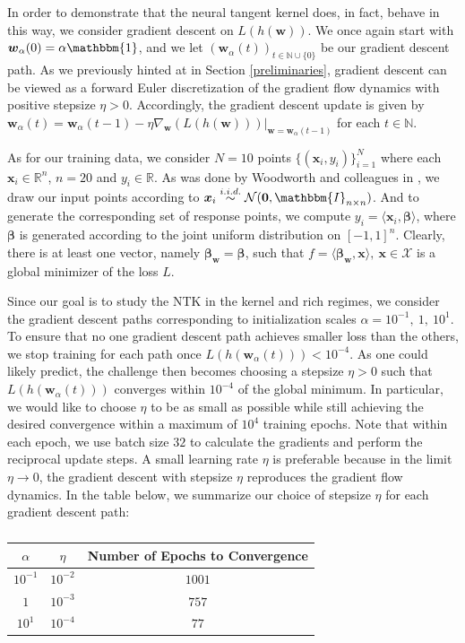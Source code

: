 \documentclass{article}
\begin{document}
In order to demonstrate that the neural tangent kernel does, in fact, behave in this way, we consider gradient descent on $L(h(\boldsymbol{w}))$. We once again start with $\boldsymbol{w}_{\alpha}(0) = \alpha \mathbbm{1}$, and we let $(\boldsymbol{w}_{\alpha}(t))_{t \in \mathbb{N} \cup \{ 0\}}$ be our gradient descent path. As we previously hinted at in Section \ref{preliminaries}, gradient descent can be viewed as a forward Euler discretization of the gradient flow dynamics with positive stepsize $\eta > 0$. Accordingly, the gradient descent update is given by $\boldsymbol{w}_{\alpha}(t) = \boldsymbol{w}_{\alpha}(t-1) - \eta \nabla_{\boldsymbol{w}} (L(h(\boldsymbol{w})))|_{\boldsymbol{w} = \boldsymbol{w}_{\alpha}(t-1)}$ for each $t \in \mathbb{N}$.

As for our training data, we consider $N=10$ points $\{ (\boldsymbol{x}_i, y_i) \}_{i=1}^N$ where each $\boldsymbol{x}_i \in \mathbb{R}^{n}$, $n = 20$ and $y_i \in \mathbb{R}$. As was done by Woodworth and colleagues in \cite{woodworth2020kernel}, we draw our input points according to $\boldsymbol{x}_i \overset{i.i.d.}{\sim} \mathcal{N}(\boldsymbol{0}, \mathbbm{I}_{n \times n})$. And to generate the corresponding set of response points, we compute $y_i = \langle \boldsymbol{x}_i, \boldsymbol{\beta} \rangle$, where $\boldsymbol{\beta}$ is generated according to the joint uniform distribution on $[-1, 1]^n$. Clearly, there is at least one vector, namely $\boldsymbol{\beta}_{\boldsymbol{w}} = \boldsymbol{\beta}$, such that $f = \langle \boldsymbol{\beta}_{\boldsymbol{w}}, \boldsymbol{x} \rangle, \ \boldsymbol{x} \in \mathcal{X}$ is a global minimizer of the loss $L$.

Since our goal is to study the NTK in the kernel and rich regimes, we consider the gradient descent paths corresponding to initialization scales $\alpha = 10^{-1}, \ 1, \ 10^{1}$. To ensure that no one gradient descent path achieves smaller loss than the others, we stop training for each path once $L(h(\boldsymbol{w}_{\alpha}(t))) < 10^{-4}$. As one could likely predict, the challenge then becomes choosing a stepsize $\eta > 0$ such that $L(h(\boldsymbol{w}_{\alpha}(t)))$ converges within $10^{-4}$ of the global minimum. In particular, we would like to choose $\eta$ to be as small as possible while still achieving the desired convergence within a maximum of $10^4$ training epochs. Note that within each epoch, we use batch size $32$ to calculate the gradients and perform the reciprocal update steps. A small learning rate $\eta$ is preferable because in the limit $\eta \rightarrow 0$, the gradient descent with stepsize $\eta$ reproduces the gradient flow dynamics. In the table below, we summarize our choice of stepsize $\eta$ for each gradient descent path:
\begin{table}[H]
\centering
\begin{tabular}{ c|c|c } 
$\alpha$ & $\eta$ & Number of Epochs to Convergence \\
\hline
$10^{-1}$ & $10^{-2}$ & $1001$ \\ 
$1$ & $10^{-3}$ & $757$ \\
$10^1$ & $10^{-4}$ & $77$
\end{tabular}
\caption{}\label{table:NTK}
\end{table}
\end{document}
